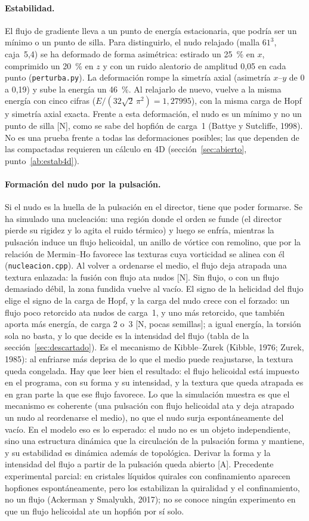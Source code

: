 \documentclass[11pt,a4paper]{article}
\newcommand{\st}[1]{\textup{[#1]}}
\newcommand{\prog}[1]{\texttt{#1}}
\newcommand{\apartado}[1]{\paragraph{#1}}
\begin{document}
\apartado{Estabilidad.} El flujo de gradiente lleva a un punto de energía estacionaria, que podría ser un mínimo o un punto de silla. Para distinguirlo, el nudo relajado (malla $61^3$, caja~5,4) se ha deformado de forma asimétrica: estirado un 25~\% en $x$, comprimido un 20~\% en $z$ y con un ruido aleatorio de amplitud 0,05 en cada punto (\prog{perturba.py}). La deformación rompe la simetría axial (asimetría $x$--$y$ de 0 a 0,19) y sube la energía un 46~\%. Al relajarlo de nuevo, vuelve a la misma energía con cinco cifras ($E/(32\sqrt2\,\pi^2)=1,27995$), con la misma carga de Hopf y simetría axial exacta. Frente a esta deformación, el nudo es un mínimo y no un punto de silla \st{N}, como se sabe del hopfión de carga~1 (Battye y Sutcliffe, 1998). No es una prueba frente a todas las deformaciones posibles; las que dependen de las compactadas requieren un cálculo en 4D (sección~\ref{sec:abierto}, punto~\ref{ab:estab4d}).

\apartado{Formación del nudo por la pulsación.} Si el nudo es la huella de la pulsación en el director, tiene que poder formarse. Se ha simulado una nucleación: una región donde el orden se funde (el director pierde su rigidez y lo agita el ruido térmico) y luego se enfría, mientras la pulsación induce un flujo helicoidal, un anillo de vórtice con remolino, que por la relación de Mermin--Ho favorece las texturas cuya vorticidad se alinea con él (\prog{nucleacion.cpp}). Al volver a ordenarse el medio, el flujo deja atrapada una textura enlazada: la fusión con flujo ata nudos \st{N}. Sin flujo, o con un flujo demasiado débil, la zona fundida vuelve al vacío. El signo de la helicidad del flujo elige el signo de la carga de Hopf, y la carga del nudo crece con el forzado: un flujo poco retorcido ata nudos de carga~1, y uno más retorcido, que también aporta más energía, de carga 2 o~3 \st{N, pocas semillas}; a igual energía, la torsión sola no basta, y lo que decide es la intensidad del flujo (tabla de la sección~\ref{sec:descartado}). Es el mecanismo de Kibble--Zurek (Kibble, 1976; Zurek, 1985): al enfriarse más deprisa de lo que el medio puede reajustarse, la textura queda congelada. Hay que leer bien el resultado: el flujo helicoidal está impuesto en el programa, con su forma y su intensidad, y la textura que queda atrapada es en gran parte la que ese flujo favorece. Lo que la simulación muestra es que el mecanismo es coherente (una pulsación con flujo helicoidal ata y deja atrapado un nudo al reordenarse el medio), no que el nudo surja espontáneamente del vacío. En el modelo eso es lo esperado: el nudo no es un objeto independiente, sino una estructura dinámica que la circulación de la pulsación forma y mantiene, y su estabilidad es dinámica además de topológica. Derivar la forma y la intensidad del flujo a partir de la pulsación queda abierto \st{A}. Precedente experimental parcial: en cristales líquidos quirales con confinamiento aparecen hopfiones espontáneamente, pero los estabilizan la quiralidad y el confinamiento, no un flujo (Ackerman y Smalyukh, 2017); no se conoce ningún experimento en que un flujo helicoidal ate un hopfión por sí solo.
\end{document}
